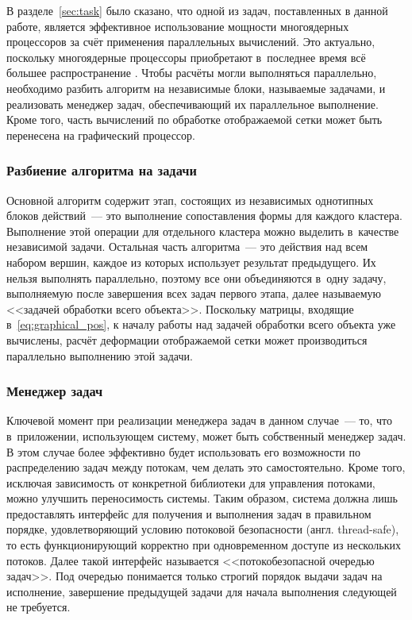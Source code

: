 \documentclass[a4paper, 14pt, titlepage]{extarticle}
\newcommand{\eng}[1]{{\English #1}}
\begin{document}
      В разделе~\ref{sec:task} было сказано, что одной из задач, поставленных в данной работе, является эффективное использование
      мощности многоядерных процессоров за счёт применения параллельных вычислений.
      Это актуально, поскольку многоядерные процессоры
      приобретают в~последнее время всё большее распространение \cite{steam-hardware}.
      Чтобы расчёты могли выполняться параллельно, необходимо разбить алгоритм на независимые
      блоки, называемые задачами, и реализовать менеджер задач, обеспечивающий их параллельное
      выполнение. Кроме того, часть вычислений по обработке отображаемой сетки может быть перенесена
      на графический процессор.

      \subsubsection{Разбиение алгоритма на задачи}

        Основной алгоритм содержит этап, состоящих из независимых однотипных блоков
        действий~--- это выполнение сопоставления формы для каждого кластера. Выполнение этой
        операции для отдельного кластера можно выделить в~качестве независимой задачи. Остальная
        часть алгоритма~--- это действия над всем набором вершин, каждое из которых использует
        результат предыдущего. Их нельзя выполнять параллельно, поэтому все они объединяются в~одну
        задачу, выполняемую после завершения всех задач первого этапа, далее называемую <<задачей
        обработки всего объекта>>. Поскольку матрицы, входящие
        в~\eqref{eq:graphical_pos}, к началу работы над задачей обработки всего объекта уже вычислены,
        расчёт деформации отображаемой сетки может производиться параллельно выполнению этой задачи.

      \subsubsection{Менеджер задач}\label{sssec:task_manager}

        Ключевой момент при реализации менеджера задач в данном случае~--- то, что в~приложении,
        использующем систему, может быть собственный менеджер задач. В этом случае более эффективно
        будет использовать его возможности по распределению задач между потокам, чем делать это
        самостоятельно. Кроме того, исключая зависимость от конкретной библиотеки для управления
        потоками, можно улучшить переносимость системы. Таким образом, система должна лишь
        предоставлять интерфейс для получения и выполнения задач в правильном порядке,
        удовлетворяющий условию потоковой безопасности (англ. \eng{thread-safe}), то есть
        функционирующий корректно при одновременном доступе из нескольких потоков. Далее такой
        интерфейс называется <<потокобезопасной очередью задач>>. Под очередью понимается только строгий порядок выдачи
        задач на исполнение, завершение предыдущей задачи для начала выполнения следующей не требуется.
\end{document}
